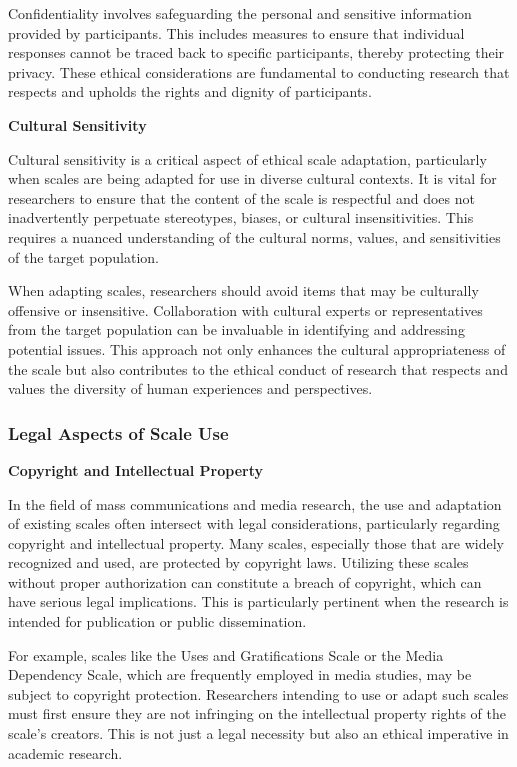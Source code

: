 \documentclass[
]{book}
\begin{document}
Confidentiality involves safeguarding the personal and sensitive information provided by participants. This includes measures to ensure that individual responses cannot be traced back to specific participants, thereby protecting their privacy. These ethical considerations are fundamental to conducting research that respects and upholds the rights and dignity of participants.

\textbf{Cultural Sensitivity}

Cultural sensitivity is a critical aspect of ethical scale adaptation, particularly when scales are being adapted for use in diverse cultural contexts. It is vital for researchers to ensure that the content of the scale is respectful and does not inadvertently perpetuate stereotypes, biases, or cultural insensitivities. This requires a nuanced understanding of the cultural norms, values, and sensitivities of the target population.

When adapting scales, researchers should avoid items that may be culturally offensive or insensitive. Collaboration with cultural experts or representatives from the target population can be invaluable in identifying and addressing potential issues. This approach not only enhances the cultural appropriateness of the scale but also contributes to the ethical conduct of research that respects and values the diversity of human experiences and perspectives.

\subsubsection*{Legal Aspects of Scale Use}\label{legal-aspects-of-scale-use}

\textbf{Copyright and Intellectual Property}

In the field of mass communications and media research, the use and adaptation of existing scales often intersect with legal considerations, particularly regarding copyright and intellectual property. Many scales, especially those that are widely recognized and used, are protected by copyright laws. Utilizing these scales without proper authorization can constitute a breach of copyright, which can have serious legal implications. This is particularly pertinent when the research is intended for publication or public dissemination.

For example, scales like the Uses and Gratifications Scale or the Media Dependency Scale, which are frequently employed in media studies, may be subject to copyright protection. Researchers intending to use or adapt such scales must first ensure they are not infringing on the intellectual property rights of the scale's creators. This is not just a legal necessity but also an ethical imperative in academic research.
\end{document}
